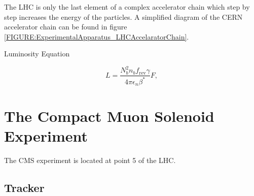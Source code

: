 The \gls{LHC} is only the last element of a complex accelerator chain which step by step increases the energy of the particles. A simplified diagram of the \gls{CERN} accelerator chain can be found in figure \ref{FIGURE:ExperimentalApparatus_LHCAccelaratorChain}.



%
% 
% 



Luminosity Equation

\begin{equation}
L=\frac{N_{b}^{2}n_{b}f_{\text{rev}}\gamma}{4\pi\epsilon_{n}\beta^{*}}F,
\end{equation}

\section{The Compact Muon Solenoid Experiment}
\label{SECTION:ExperimentalApparatus_CMS}

The \gls{CMS} experiment is located at point 5 of the \gls{LHC}.





\subsection{Tracker}
\label{SUBSECTION:ExperimentalApparatus_CMS_Tracker}

